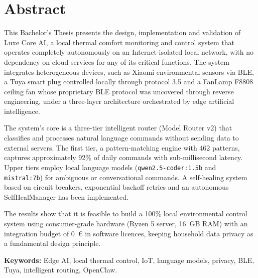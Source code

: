 \documentclass[12pt, a4paper, twoside, openright]{report}
\begin{document}
\cleardoublepage

\chapter*{Abstract}
\label{ch:abstract}

This Bachelor's Thesis presents the design, implementation and validation of Luxe Core AI, a local thermal comfort monitoring and control system that operates completely autonomously on an Internet-isolated local network, with no dependency on cloud services for any of its critical functions. The system integrates heterogeneous devices, such as Xiaomi environmental sensors via BLE, a Tuya smart plug controlled locally through protocol 3.5 and a FanLamp F8808 ceiling fan whose proprietary BLE protocol was uncovered through reverse engineering, under a three-layer architecture orchestrated by edge artificial intelligence.

The system's core is a three-tier intelligent router (Model Router v2) that classifies and processes natural language commands without sending data to external servers. The first tier, a pattern-matching engine with 462 patterns, captures approximately 92\% of daily commands with sub-millisecond latency. Upper tiers employ local language models (\texttt{qwen2.5-coder:1.5b} and \texttt{mistral:7b}) for ambiguous or conversational commands. A self-healing system based on circuit breakers, exponential backoff retries and an autonomous SelfHealManager has been implemented.

The results show that it is feasible to build a 100\% local environmental control system using consumer-grade hardware (Ryzen 5 server, 16~GB RAM) with an integration budget of 0~\euro{} in software licences, keeping household data privacy as a fundamental design principle.

\vspace{0.5cm}
\noindent\textbf{Keywords:} Edge AI, local thermal control, IoT, language models, privacy, BLE, Tuya, intelligent routing, OpenClaw.

\cleardoublepage

\tableofcontents
\cleardoublepage
{}
\listoffigures
\cleardoublepage
{}
\listoftables

\cleardoublepage
{}
\end{document}
